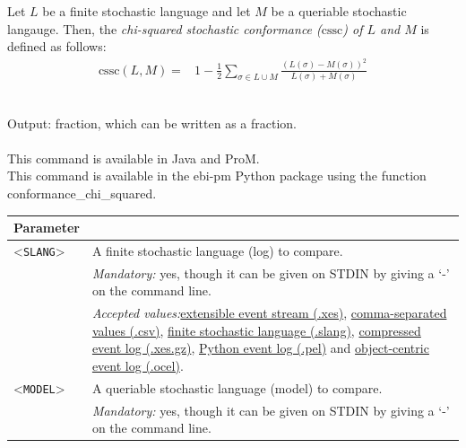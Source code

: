 {        \begin{definition}
            \label{def:cssc}
                Let $L$ be a finite stochastic language and let $M$ be a queriable stochastic langauge.
                Then, the \emph{chi-squared stochastic conformance ($\text{cssc}$) of $L$ and $M$} is defined as follows: 
                \begin{align*}
                    \text{cssc}(L, M) ={}& 1 - \frac{1}{2} \sum_{\sigma \in L \cup M} \frac{(L(\sigma)-M(\sigma))^2}{L(\sigma)+M(\sigma)}
                \end{align*}       
            \end{definition}~\\
\noindent Output: fraction, which can be written as a fraction.\\
\\This command is available in Java and ProM.
\\This command is available in the ebi-pm Python package using the function conformance\_chi\_squared.
\begin{tabularx}{\linewidth}{lX}
\toprule
Parameter \\\midrule
<\texttt{SLANG}>&A finite stochastic language (log) to compare.\\
&\textit{Mandatory:} \quad yes, though it can be given on STDIN by giving a `-' on the command line.\\
&\textit{Accepted values:}\quad \hyperref[filehandler:extensible event stream]{extensible event stream (.xes)}, \hyperref[filehandler:comma-separated values]{comma-separated values (.csv)}, \hyperref[filehandler:finite stochastic language]{finite stochastic language (.slang)}, \hyperref[filehandler:compressed event log]{compressed event log (.xes.gz)}, \hyperref[filehandler:Python event log]{Python event log (.pel)} and \hyperref[filehandler:object-centric event log]{object-centric event log (.ocel)}.\\
<\texttt{MODEL}>&A queriable stochastic language (model) to compare.\\
&\textit{Mandatory:} \quad yes, though it can be given on STDIN by giving a `-' on the command line.\\

\end{tabularx}}
